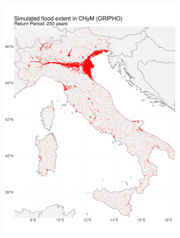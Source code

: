 \begin{figure}
\begin{subfigure}{.49\textwidth}
        \includegraphics[width=\textwidth]{figures/valid_flood/flooded_areas/T250}
    \end{subfigure}
    \begin{subfigure}{.49\textwidth}

\end{subfigure}
\end{figure}
